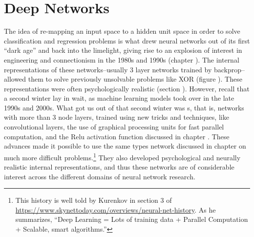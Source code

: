 \chapter{Deep Networks}\label{deepNets}


The idea of re-mapping an input space to a hidden unit space in order to solve classification and regression problems is what drew neural networks out of its first ``dark age'' and back into the limelight, giving rise to an explosion of interest in engineering and connectionism in the 1980s and 1990s (chapter ). The internal representations of these networks--usually 3 layer networks trained by backprop--allowed them to solve previously unsolvable problems like XOR (figure ). These representations were often psychologically realistic (section ). However, recall that a second  winter lay in wait, as machine learning models took over in the late 1990s and 2000s. What got us out of that second winter was s, that is, networks with more than 3 node layers, trained using new tricks and techniques, like convolutional layers, the use of graphical processing units for fast parallel computation, and the Relu activation function discussed in chapter . These advances made it possible to use the same types network discussed in chapter  on much more difficult problems.\footnote{This history is well told by Kurenkov in section 3 of \url{https://www.skynettoday.com/overviews/neural-net-history}. As he summarizes, ``Deep Learning = Lots of training data + Parallel Computation + Scalable, smart algorithms.''}  They also developed psychological and neurally realistic internal representations, and thus these networks are of considerable interest across the different domains of neural network research.

